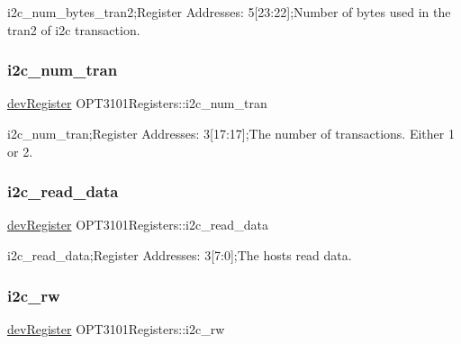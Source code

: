 i2c\+\_\+num\+\_\+bytes\+\_\+tran2;Register Addresses\+: 5\mbox{[}23\+:22\mbox{]};Number of bytes used in the tran2 of i2c transaction. 

\mbox{\label{class_o_p_t3101_registers_a0a161f183b2a43ba1fb8bc1fa7e7d764}} 
\subsubsection{\texorpdfstring{i2c\+\_\+num\+\_\+tran}{i2c\_num\_tran}}
{\footnotesize\ttfamily \mbox{\hyperlink{classdev_register}{dev\+Register}} O\+P\+T3101\+Registers\+::i2c\+\_\+num\+\_\+tran}



i2c\+\_\+num\+\_\+tran;Register Addresses\+: 3\mbox{[}17\+:17\mbox{]};The number of transactions. Either 1 or 2. 

\mbox{\label{class_o_p_t3101_registers_a5ea093c7c669af60ee3528d4e47751ec}} 
\subsubsection{\texorpdfstring{i2c\+\_\+read\+\_\+data}{i2c\_read\_data}}
{\footnotesize\ttfamily \mbox{\hyperlink{classdev_register}{dev\+Register}} O\+P\+T3101\+Registers\+::i2c\+\_\+read\+\_\+data}



i2c\+\_\+read\+\_\+data;Register Addresses\+: 3\mbox{[}7\+:0\mbox{]};The hosts read data. 

\mbox{\label{class_o_p_t3101_registers_a21638bd4e30c109088a1ac38fb23ef23}} 
\subsubsection{\texorpdfstring{i2c\+\_\+rw}{i2c\_rw}}
{\footnotesize\ttfamily \mbox{\hyperlink{classdev_register}{dev\+Register}} O\+P\+T3101\+Registers\+::i2c\+\_\+rw}



